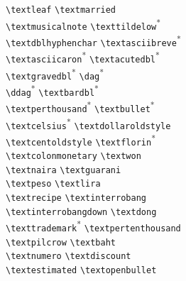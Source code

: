 {\begin{tabbing}
\textleaf \> \lstinline+\textleaf+ \> \textmarried \> \lstinline+\textmarried+\\
\textmusicalnote \> \lstinline+\textmusicalnote+ \> \texttildelow \> \lstinline+\texttildelow+\textsuperscript{*} \\
\textdblhyphenchar \> \lstinline+\textdblhyphenchar+ \> \textasciibreve \> \lstinline+\textasciibreve+\textsuperscript{*} \\
\textasciicaron \> \lstinline+\textasciicaron+\textsuperscript{*}  \> \textacutedbl \> \lstinline+\textacutedbl+\textsuperscript{*} \\
\textgravedbl \> \lstinline+\textgravedbl+\textsuperscript{*}  \> \textdagger \> \lstinline+\dag+\textsuperscript{*} \\
\textdaggerdbl \> \lstinline+\ddag+\textsuperscript{*} \> \textbardbl \> \lstinline+\textbardbl+\textsuperscript{*} \\
\textperthousand \> \lstinline+\textperthousand+\textsuperscript{*} \> \textbullet \> \lstinline+\textbullet+\textsuperscript{*} \\
\textcelsius \> \lstinline+\textcelsius+\textsuperscript{*}  \> \textdollaroldstyle \> \lstinline+\textdollaroldstyle+\\
\textcentoldstyle \> \lstinline+\textcentoldstyle+ \> \textflorin \> \lstinline+\textflorin+\textsuperscript{*} \\
\textcolonmonetary \> \lstinline+\textcolonmonetary+ \> \textwon \> \lstinline+\textwon+\\
\textnaira \> \lstinline+\textnaira+ \> \textguarani \> \lstinline+\textguarani+\\
\textpeso \> \lstinline+\textpeso+ \> \textlira \> \lstinline+\textlira+\\
\textrecipe \> \lstinline+\textrecipe+ \> \textinterrobang \> \lstinline+\textinterrobang+\\
\textinterrobangdown \> \lstinline+\textinterrobangdown+ \> \textdong \> \lstinline+\textdong+\\
\texttrademark \> \lstinline+\texttrademark+\textsuperscript{*} \> \textpertenthousand \> \lstinline+\textpertenthousand+\\
\textpilcrow \> \lstinline+\textpilcrow+ \> \textbaht \> \lstinline+\textbaht+\\
\textnumero \> \lstinline+\textnumero+ \> \textdiscount \> \lstinline+\textdiscount+\\
\textestimated \> \lstinline+\textestimated+ \> \textopenbullet \> \lstinline+\textopenbullet+\\

\end{tabbing}}

